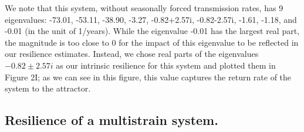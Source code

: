 \documentclass[12pt]{article}
\begin{document}
We note that this system, without seasonally forced transmission rates, has 9 eigenvalues: -73.01, -53.11, -38.90, -3.27, -0.82+2.57i, -0.82-2.57i, -1.61, -1.18, and -0.01 (in the unit of 1/years). 
While the eigenvalue -0.01 has the largest real part, the magnitude is too close to 0 for the impact of this eigenvalue to be reflected in our resilience estimates.
Instead, we chose real parts of the eigenvalues $-0.82\pm2.57i$ as our intrinsic resilience for this system and plotted them in Figure 2I;
as we can see in this figure, this value captures the return rate of the system to the attractor.

\subsection*{Resilience of a multistrain system.}
\end{document}

